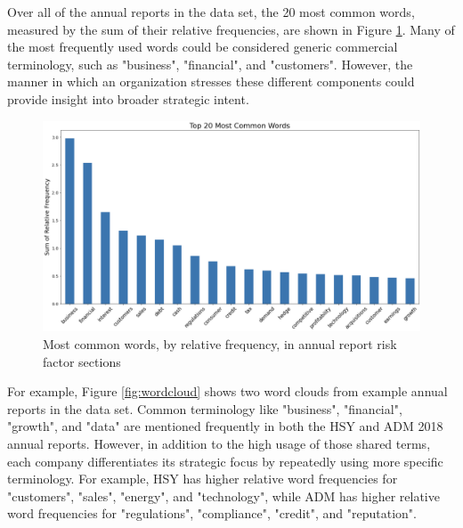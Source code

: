 \documentclass{article}
\begin{document}
Over all of the annual reports in the data set, the 20 most common words, measured by the sum of their relative frequencies, are shown in Figure \ref{fig:BoW_Bar_Chart}. Many of the most frequently used words could be considered generic commercial terminology, such as "business", "financial", and  "customers". However, the manner in which an organization stresses these different components could provide insight into broader strategic intent.

\begin{figure}[ht]
    \centering
    \includegraphics[width = 0.8\linewidth]{BoW_Bar_Chart.png}
    \caption{Most common words, by relative frequency, in annual report risk factor sections}
    \label{fig:BoW_Bar_Chart}
\end{figure}

For example, Figure \ref{fig:wordcloud} shows two word clouds from example annual reports in the data set. Common terminology like "business", "financial", "growth", and "data" are mentioned frequently in both the HSY and ADM 2018 annual reports. However, in addition to the high usage of those shared terms, each company differentiates its strategic focus by repeatedly using more specific terminology. For example, HSY has higher relative word frequencies for "customers", "sales", "energy", and "technology", while ADM has higher relative word frequencies for "regulations", "compliance", "credit", and "reputation".
\end{document}
